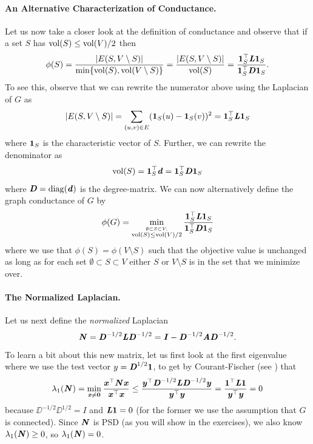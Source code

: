 \paragraph{An Alternative Characterization of Conductance.} Let us now take a closer look at the definition of conductance and observe that if a set $S$ has $\operatorname{vol}(S) \leq \operatorname{vol}(V)/2$ then
\[
\phi(S) = \frac{|E(S, V \setminus S)|}{ \min\{\operatorname{vol}(S), \operatorname{vol}(V \setminus S)\} } = \frac{|E(S, V \setminus S)|}{ \operatorname{vol}(S) } = \frac{\boldsymbol{1}_S^\top \boldsymbol{\mathit{L}} \boldsymbol{1}_S}{\boldsymbol{1}_S^\top \boldsymbol{\mathit{D}} \boldsymbol{1}_S}.
\]
To see this, observe that we can rewrite the numerator above using the Laplacian of $G$ as
\[
|E(S, V \setminus S)| = \sum_{(u,v)\in E} (\boldsymbol{1}_S(u) - \boldsymbol{1}_S(v))^2 =  \boldsymbol{1}_S^\top \boldsymbol{\mathit{L}} \boldsymbol{1}_S
\]
where $\boldsymbol{1}_S$ is the characteristic vector of $S$. Further, we can rewrite the denominator as 
\[
\operatorname{vol}(S) = \boldsymbol{1}_S^\top \boldsymbol{\mathit{d}} = \boldsymbol{1}_S^\top \boldsymbol{\mathit{D}} \boldsymbol{1}_S
\]
where $\boldsymbol{\mathit{D}} = \operatorname*{diag}(\boldsymbol{\mathit{d}})$ is the degree-matrix. We can now alternatively define the graph conductance of $G$ by
\begin{equation}\label{eq:conductanceAltDef}
\phi(G) = \min_{\stackrel{\emptyset \subset S \subset V,} {\operatorname{vol}(S) \leq \operatorname{vol}(V)/2}} \frac{\boldsymbol{1}_S^\top \boldsymbol{\mathit{L}} \boldsymbol{1}_S}{\boldsymbol{1}_S^\top \boldsymbol{\mathit{D}} \boldsymbol{1}_S} 
\end{equation}
where we use that $\phi(S) = \phi(V \setminus S)$ such that the objective value is unchanged as long as for each set $\emptyset \subset S \subset V$ either $S$ or $V \setminus S$ is in the set that we minimize over.

\paragraph{The Normalized Laplacian.} Let us next define the \emph{normalized} Laplacian \[
\boldsymbol{\mathit{N}} = \boldsymbol{\mathit{D}}^{-1/2} \boldsymbol{\mathit{L}} \boldsymbol{\mathit{D}}^{-1/2} = \boldsymbol{\mathit{I}} -  \boldsymbol{\mathit{D}}^{-1/2} \boldsymbol{\mathit{A}} \boldsymbol{\mathit{D}}^{-1/2}.
\]
To learn a bit about this new matrix, let us first look at the first eigenvalue where we use the test vector $y = \boldsymbol{\mathit{D}}^{1/2}\boldsymbol{1}$, to get by Courant-Fischer (see ) that
\begin{align}\label{eq:plugInNormalizedVector}
    \lambda_1(\boldsymbol{\mathit{N}}) =
    \min_{
      \substack{ \boldsymbol{\mathit{x}} \neq \boldsymbol{0}}
    }
    \frac{\boldsymbol{\mathit{x}}^\top \boldsymbol{\mathit{N}}\boldsymbol{\mathit{x}}}{\boldsymbol{\mathit{x}}^\top\boldsymbol{\mathit{x}}}  \leq \frac{\boldsymbol{\mathit{y}}^\top\boldsymbol{\mathit{D}}^{-1/2} \boldsymbol{\mathit{L}} \boldsymbol{\mathit{D}}^{-1/2} \boldsymbol{\mathit{y}}}{\boldsymbol{\mathit{y}}^\top\boldsymbol{\mathit{y}}} = \frac{\boldsymbol{1}^\top \boldsymbol{\mathit{L}} \boldsymbol{1}}{\boldsymbol{\mathit{y}}^\top\boldsymbol{\mathit{y}}} = 0
\end{align}
because $\DD^{-1/2} \DD^{1/2} = I$ and $\boldsymbol{\mathit{L}} \boldsymbol{1} = 0$ (for the former we use the assumption that $G$ is connected). Since $\boldsymbol{\mathit{N}}$ is PSD (as you will show in the exercises), we also know $\lambda_1(\boldsymbol{\mathit{N}}) \geq 0$, so $\lambda_1(\boldsymbol{\mathit{N}}) = 0$.

